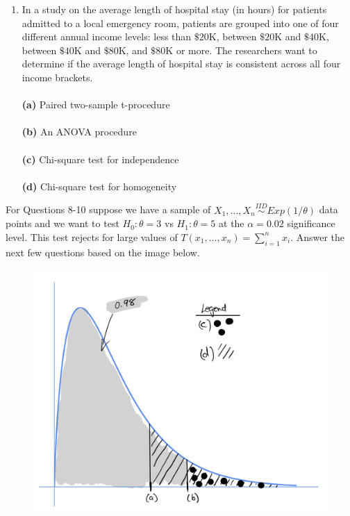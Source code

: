 \documentclass[12pt]{article}
\begin{document}
\begin{enumerate}[leftmargin=\labelsep]
\item In a study on the average length of hospital stay (in hours) for patients admitted to a local emergency room, patients are grouped into one of four different annual income levels: less than $\$20$K, between $\$20$K and $\$40$K, between $\$40$K and $\$80$K, and $\$80$K or more. The researchers want to determine if the average length of hospital stay is consistent across all four income brackets.\\ \vspace{1mm}\\
{\bf (a)} \hspace{2mm} Paired two-sample t-procedure\\ \vspace{1mm}\\
{\bf (b)} \hspace{2mm} An ANOVA procedure\\   \vspace{1mm}\\
{\bf (c)} \hspace{2mm} Chi-square test for independence\\  \vspace{1mm}\\
{\bf (d)} \hspace{2mm} Chi-square test for homogeneity\\
\end{enumerate}



\noindent For Questions 8-10 suppose we have a sample of $X_1,\dots,X_n \stackrel{IID}{\sim} Exp(1/\theta)$ data points and we want to test $H_0: \theta=3$ vs $H_1: \theta=5$ at the $\alpha=0.02$ significance level. This test rejects for large values of $T(x_1, \dots, x_n) = \sum_{i=1}^{n}x_i$. Answer the next few questions based on the image below. 


\begin{figure}[h]
\centering
\includegraphics[width=0.7\linewidth]{Stat 61 final.png}
\end{figure}	
\end{document}
